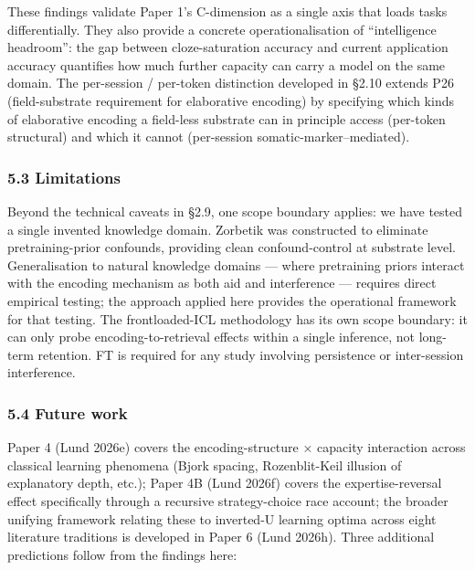 \documentclass[
]{article}
\begin{document}
These findings validate Paper 1's C-dimension as a single axis that
loads tasks differentially. They also provide a concrete
operationalisation of ``intelligence headroom'': the gap between
cloze-saturation accuracy and current application accuracy quantifies
how much further capacity can carry a model on the same domain. The
per-session / per-token distinction developed in §2.10 extends P26
(field-substrate requirement for elaborative encoding) by specifying
which kinds of elaborative encoding a field-less substrate can in
principle access (per-token structural) and which it cannot (per-session
somatic-marker--mediated).

\subsubsection{5.3 Limitations}\label{limitations}

Beyond the technical caveats in §2.9, one scope boundary applies: we
have tested a single invented knowledge domain. Zorbetik was constructed
to eliminate pretraining-prior confounds, providing clean
confound-control at substrate level. Generalisation to natural knowledge
domains --- where pretraining priors interact with the encoding
mechanism as both aid and interference --- requires direct empirical
testing; the approach applied here provides the operational framework
for that testing. The frontloaded-ICL methodology has its own scope
boundary: it can only probe encoding-to-retrieval effects within a
single inference, not long-term retention. FT is required for any study
involving persistence or inter-session interference.

\subsubsection{5.4 Future work}\label{future-work}

Paper 4 (Lund 2026e) covers the encoding-structure × capacity
interaction across classical learning phenomena (Bjork spacing,
Rozenblit-Keil illusion of explanatory depth, etc.); Paper 4B (Lund
2026f) covers the expertise-reversal effect specifically through a
recursive strategy-choice race account; the broader unifying framework
relating these to inverted-U learning optima across eight literature
traditions is developed in Paper 6 (Lund 2026h). Three additional
predictions follow from the findings here:
\end{document}
